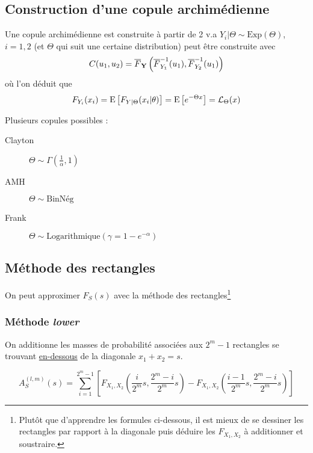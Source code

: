 \documentclass[10pt, french]{article}
\begin{document}
\begin{multicols*}{2}
\subsection{Construction d'une copule archimédienne}
Une copule archimédienne est construite à partir de 2 v.a  $Y_i|\Theta \sim \text{Exp}(\Theta)$, $i=1,2$ (et $\Theta$ qui suit une certaine distribution)  peut être construite  avec
\begin{equation}
C(u_1, u_2) = \overline{F}_{\mathbf{Y}} \left ( \overline{F}_{Y_1}^{-1}(u_1), \overline{F}_{Y_2}^{-1}(u_1) \right )
\end{equation}
où l'on déduit que 
\begin{align*}
F_{Y_i}(x_i) = \mathrm{E} \left[ F_{Y|\Theta}(x_i | \theta) \right] = \mathrm{E} \left[ e^{-\Theta x} \right] = \mathcal{L}_\Theta(x)
\end{align*}

Plusieurs copules possibles : 
\begin{description}
\item[Clayton] $\Theta \sim \Gamma(\frac{1}{\alpha}, 1)$
\item[AMH] $\Theta \sim \text{BinNég}$
\item[Frank] $\Theta \sim \text{Logarithmique}(\gamma = 1 - e^{-\alpha})$
\end{description}


\subsection{Méthode des rectangles}
On peut approximer $F_S(s)$ avec la méthode des rectangles\footnote{Plutôt que d'apprendre les formules ci-dessous, il est mieux de se dessiner les rectangles par rapport à la diagonale puis déduire les $F_{X_1, X_2}$ à additionner et soustraire.}

\subsubsection{Méthode \textit{lower}}
On additionne les masses de probabilité associées aux $2^m-1$ rectangles se trouvant \underline{en-dessous} de la diagonale $x_1 + x_2 = s$.

\begin{equation}
\label{eq:rectangle-lower}
A_{S}^{(l, m)}(s) = \sum_{i=1}^{2^m-1} \left [ F_{X_1, X_2} \left( \frac{i}{2^m} s, \frac{2^m - i}{2^m} s \right) -  F_{X_1, X_2} \left( \frac{i-1}{2^m} s, \frac{2^m - i}{2^m} s \right) \right ]
\end{equation}


\end{multicols*}
\end{document}
